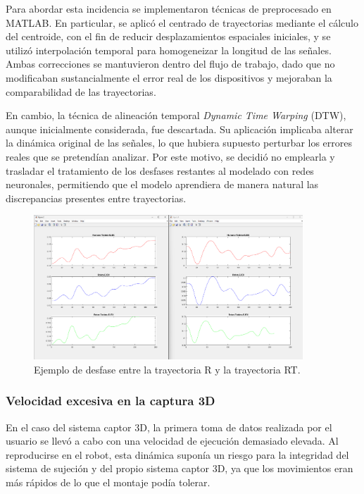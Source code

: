 \documentclass[12pt,a4paper,oneside]{report}
\begin{document}
Para abordar esta incidencia se implementaron técnicas de 
preprocesado en MATLAB. En particular, se aplicó el centrado de 
trayectorias mediante el cálculo del centroide, con el fin de 
reducir desplazamientos espaciales iniciales, y se utilizó 
interpolación temporal para homogeneizar la longitud de las 
señales. Ambas correcciones se mantuvieron dentro del flujo de 
trabajo, dado que no modificaban sustancialmente el error real de 
los dispositivos y mejoraban la comparabilidad de las trayectorias.  

En cambio, la técnica de alineación temporal \textit{Dynamic Time 
Warping} (DTW), aunque inicialmente considerada, fue descartada. 
Su aplicación implicaba alterar la dinámica original de las 
señales, lo que hubiera supuesto perturbar los errores reales que 
se pretendían analizar. Por este motivo, se decidió no emplearla y 
trasladar el tratamiento de los desfases restantes al modelado con 
redes neuronales, permitiendo que el modelo aprendiera de manera 
natural las discrepancias presentes entre trayectorias.

\begin{figure}[H]
  \centering
  \includegraphics[width=0.9\textwidth]{figuras/Comparacion Ejes.png}
  \caption{Ejemplo de desfase entre la trayectoria \acrshort{R} 
          y la trayectoria \acrshort{RT}.}
\end{figure}

\subsubsection*{Velocidad excesiva en la captura 3D}
En el caso del sistema captor 3D, la primera toma de datos 
realizada por el usuario se llevó a cabo con una velocidad de 
ejecución demasiado elevada. Al reproducirse en el robot, esta 
dinámica suponía un riesgo para la integridad del sistema de 
sujeción y del propio sistema captor 3D, ya que los 
movimientos eran más rápidos de lo que el montaje podía tolerar.  
\end{document}
